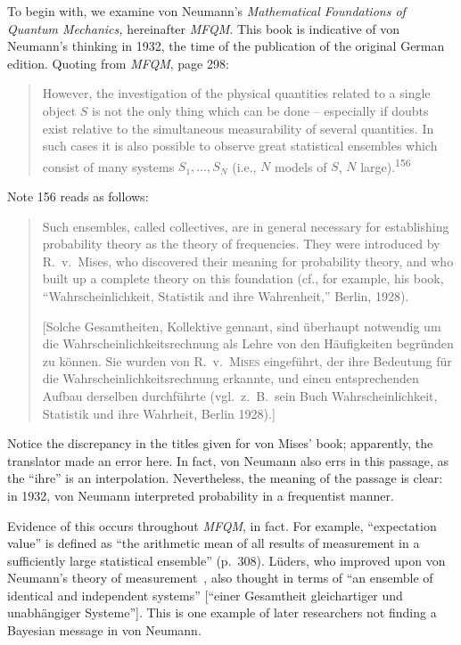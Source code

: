 \documentclass[aps,pra,superscriptaddress,12pt,tightenlines,nofootinbib]{revtex4-2}
\newcommand{\booktitle}{\textsl}
\newcommand{\MFQM}{\textsl{MFQM}}
\begin{document}
To begin with, we examine von Neumann's \booktitle{Mathematical
  Foundations of Quantum Mechanics,} hereinafter \MFQM.  This book is
indicative of von Neumann's thinking in 1932, the time of the
publication of the original German edition.  Quoting from \MFQM, page
298:
\begin{quotation}
However, the investigation of the physical quantities related to a
single object $S$ is not the only thing which can be done --
especially if doubts exist relative to the simultaneous measurability
of several quantities.  In such cases it is also possible to observe
great statistical ensembles which consist of many systems
$S_1,\ldots,S_N$ (i.e., $N$ models of $S$, $N$
large).\textsuperscript{156}
\end{quotation}
Note 156 reads as follows:
\begin{quotation}
Such ensembles, called collectives, are in general necessary for
establishing probability theory as the theory of frequencies.  They
were introduced by R.\ v.\ Mises, who discovered their meaning for
probability theory, and who built up a complete theory on this
foundation (cf., for example, his book, ``Wahrscheinlichkeit,
Statistik and ihre Wahrenheit,'' Berlin, 1928).

[Solche Gesamtheiten, Kollektive gennant, sind \"uberhaupt notwendig
  um die Wahrscheinlichkeitsrechnung als Lehre von den H\"aufigkeiten
  begr\"unden zu k\"onnen.  Sie wurden von R.\ v.\ \textsc{Mises}
  eingef\"uhrt, der ihre Bedeutung f\"ur die
  Wahrscheinlichkeitsrechnung erkannte, und einen entsprechenden
  Aufbau derselben durchf\"uhrte (vgl.\ z.\ B.\ sein Buch
  Wahrscheinlichkeit, Statistik und ihre Wahrheit, Berlin 1928).]
\end{quotation}
Notice the discrepancy in the titles given for von Mises' book;
apparently, the translator made an error here.  In fact, von Neumann
also errs in this passage, as the ``ihre'' is an interpolation.
Nevertheless, the meaning of the passage is clear: in 1932, von
Neumann interpreted probability in a frequentist manner.

Evidence of this occurs throughout \MFQM, in fact.  For example,
``expectation value'' is defined as ``the arithmetic mean of all
results of measurement in a sufficiently large statistical ensemble''
(p.\ 308).  L\"uders, who improved upon von Neumann's theory of
measurement~\cite{Lueders1951}, also thought in terms of ``an ensemble
of identical and independent systems'' [``einer Gesamtheit
  gleichartiger und unabh\"angiger Systeme''].  This is one example of
later researchers not finding a Bayesian message in von Neumann.
\end{document}
